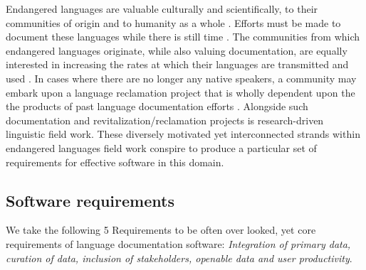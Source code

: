 \documentclass[11pt]{article}
\begin{document}
Endangered languages are valuable culturally and scientifically, to their
communities of origin \cite{Ironstrack:2012} and to humanity as a whole
\cite{harrison2007languages}. Efforts must be made to document these languages
while there is still time \cite{Good:2012,Thieberger:2012}. The communities from which endangered languages
originate, while also valuing documentation, are equally interested in
increasing the rates at which their languages are transmitted and used
\cite{Myaamia:2001}. In cases where there are no longer any native speakers, a
community may embark upon a language reclamation project that is wholly
dependent upon the the products of past language documentation efforts
\cite{Leonard:2012,Costa:2012}. Alongside such documentation and
revitalization/reclamation projects is research-driven linguistic field work.
These diversely motivated yet interconnected strands within endangered
languages field work conspire to produce a particular set of requirements for
effective software in this domain.




\subsection{Software requirements}
\label{sec:requirements}



We take the following 5 Requirements to be often over looked, yet core requirements of language documentation software: \emph{Integration of primary data, curation of data,  inclusion of stakeholders, openable data and user productivity}. 
\end{document}
